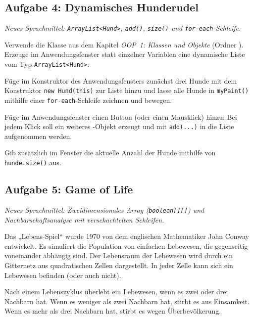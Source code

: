 \subsection{Aufgabe 4: Dynamisches Hunderudel \tagLK}
\noindent \emph{Neues Sprachmittel: \texttt{ArrayList<Hund>}, \texttt{add()}, \texttt{size()} und \texttt{for-each}-Schleife.}

Verwende die Klasse  aus dem Kapitel \emph{OOP~1: Klassen und
Objekte} (Ordner ). Erzeuge im
Anwendungsfenster statt einzelner Variablen eine dynamische Liste vom Typ
\lstinline|ArrayList<Hund>|:

\begin{compactenum}[a)]
\item Füge im Konstruktor des Anwendungsfensters zunächst drei Hunde mit dem
Konstruktor \lstinline|new Hund(this)| zur Liste hinzu und lasse alle Hunde
in \lstinline|myPaint()| mithilfe einer \texttt{for-each}-Schleife zeichnen
und bewegen.
\item Füge im Anwendungsfenster einen Button  (oder
einen Mausklick) hinzu: Bei jedem Klick soll ein weiteres -Objekt
erzeugt und mit \lstinline|add(...)| in die Liste aufgenommen werden.
\item Gib zusätzlich im Fenster die aktuelle Anzahl der Hunde mithilfe von
\lstinline|hunde.size()| aus.
\end{compactenum}




\subsection{Aufgabe 5: Game of Life \tagZusatz \tagLK}
\noindent \emph{Neues Sprachmittel: Zweidimensionales Array (\texttt{boolean[][]}) und Nachbarschaftsanalyse mit verschachtelten Schleifen.}

Das „Lebens-Spiel“ wurde 1970 von dem englischen Mathematiker John Conway
entwickelt. Es simuliert die Population von einfachen Lebewesen, die
gegenseitig voneinander abhängig sind. Der Lebensraum der Lebewesen wird durch
ein Gitternetz aus quadratischen Zellen dargestellt. In jeder Zelle kann sich
ein Lebewesen befinden (oder auch nicht).

Nach einem Lebenszyklus überlebt ein Lebewesen, wenn es zwei oder drei Nachbarn
hat. Wenn es weniger als zwei Nachbarn hat, stirbt es aus Einsamkeit. Wenn es
mehr als drei Nachbarn hat, stirbt es wegen Überbevölkerung.

